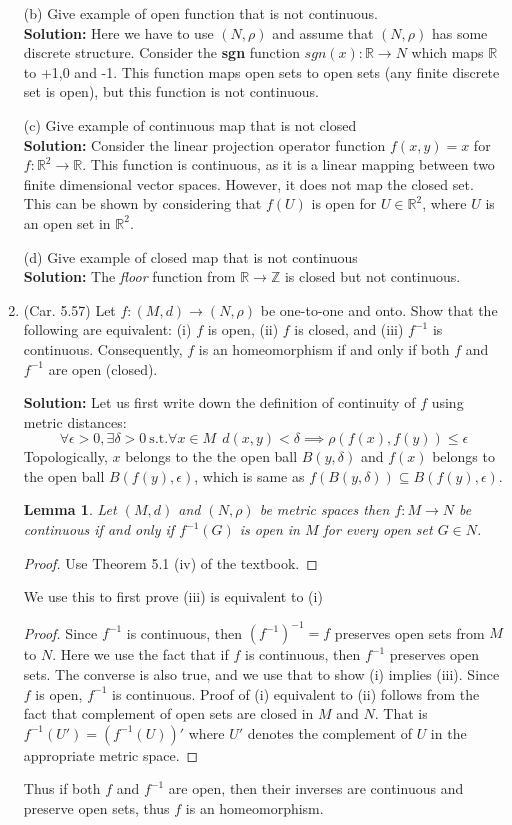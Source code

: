 \documentclass{article}
\newtheorem{lem}{Lemma}
\newtheorem{proof}{Proof}
\def\le{\leqslant}
\def\to{\rightarrow}
\def\RR{\mathbb R}
\def\ZZ{\mathbb Z}
\begin{document}
\begin{enumerate}
(b) Give example of open function that is not continuous.\\
\textbf{Solution:} Here we have to use $(N,\rho)$ and assume that
$(N,\rho)$ has some discrete structure. Consider the \textbf{sgn}
function $sgn(x):\RR\to N$ which maps $\RR$ to +1,0 and -1. This function
maps open sets to open sets (any finite discrete set is open), but
this function is not continuous.

(c) Give example of continuous map that is not closed\\
\textbf{Solution:}  Consider the linear projection operator function
$f(x,y)=x$ for $f:\RR^2\to \RR$. This function is continuous, as it
is a linear mapping between two finite dimensional vector spaces. 
However, it does not map the closed set. This can be shown by
considering that $f(U)$ is open for $U\in\RR^2$, where $U$ is an open
set in $\RR^2$.

(d) Give example of closed map that is not continuous\\
\textbf{Solution:} The \emph{floor} function from $\RR\to \ZZ$ is
closed but not continuous.


\item (Car. 5.57) Let $f:(M,d)\to (N,\rho)$ be one-to-one and onto.
Show that the following are equivalent: (i) $f$ is open, (ii) $f$
is closed, and (iii) $f^{-1}$ is continuous. Consequently, $f$
is an homeomorphism if and only if both $f$ and $f^{-1}$ are 
open (closed).

\textbf{Solution:} Let us first write down the definition
of continuity of $f$ using metric distances:
\[
\forall \epsilon > 0, \exists \delta > 0\ \textrm{s.t.} \forall x \in M\ \
d(x,y) < \delta \implies \rho(f(x),f(y)) \le \epsilon
\]
Topologically, $x$ belongs to the the open ball $B(y,\delta)$
and $f(x)$ belongs to the open ball $B(f(y),\epsilon)$, which is
same as $f(B(y,\delta)) \subseteq B(f(y),\epsilon)$.
\begin{lem}
Let $(M,d)$ and $(N,\rho)$ be metric spaces then $f:M\to N$
be continuous if and only if $f^{-1}(G)$ is open in $M$ for
every open set $G\in N$.
\end{lem}
\begin{proof}
Use Theorem 5.1 (iv) of the textbook.
\end{proof}
We use this to first prove (iii) is equivalent to (i)
\begin{proof}
Since $f^{-1}$ is continuous, then $(f^{-1})^{-1}=f$ preserves open sets from
$M$ to $N$. Here we use the fact that if $f$ is continuous, then $f^{-1}$
preserves open sets. 
The converse is also true, and we use that to show (i) implies (iii).
Since $f$ is open, $f^{-1}$ is continuous.
Proof of (i) equivalent to (ii) follows from
the fact that complement of open sets are closed in $M$ and $N$.
That is $f^{-1}(U')=(f^{-1}(U))'$ where $U'$ denotes the complement
of $U$ in the appropriate metric space.
\end{proof}
Thus if both $f$ and $f^{-1}$ are open, then their inverses are
continuous and preserve open sets, thus $f$ is an homeomorphism.


\end{enumerate}
\end{document}
